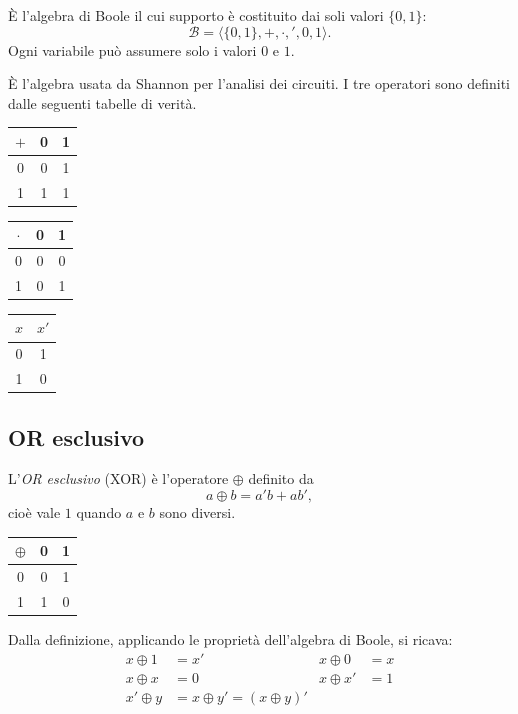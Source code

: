 \documentclass[11pt,a4paper]{article}
\begin{document}
\begin{definizione}
È l'algebra di Boole il cui supporto è costituito dai soli valori $\{0, 1\}$:
\[
  \mathcal{B} = \langle \{0,1\}, +, \cdot, ', 0, 1 \rangle .
\]
Ogni variabile può assumere solo i valori $0$ e $1$.
\end{definizione}

È l'algebra usata da Shannon per l'analisi dei circuiti. I tre operatori sono
definiti dalle seguenti tabelle di verità.

\begin{center}
\begin{tabular}{c|cc}
$+$ & 0 & 1 \\ \midrule
0 & 0 & 1 \\
1 & 1 & 1
\end{tabular}
\qquad\qquad
\begin{tabular}{c|cc}
$\cdot$ & 0 & 1 \\ \midrule
0 & 0 & 0 \\
1 & 0 & 1
\end{tabular}
\qquad\qquad
\begin{tabular}{c|c}
$x$ & $x'$ \\ \midrule
0 & 1 \\
1 & 0
\end{tabular}
\end{center}

\subsection{OR esclusivo}

L'\emph{OR esclusivo} (XOR) è l'operatore $\oplus$ definito da
\[
  a \oplus b = a' b + a b' ,
\]
cioè vale $1$ quando $a$ e $b$ sono diversi.

\begin{center}
\begin{tabular}{c|cc}
$\oplus$ & 0 & 1 \\ \midrule
0 & 0 & 1 \\
1 & 1 & 0
\end{tabular}
\end{center}

Dalla definizione, applicando le proprietà dell'algebra di Boole, si ricava:
\begin{align}
x \oplus 1 &= x' & x \oplus 0 &= x \\
x \oplus x &= 0 & x \oplus x' &= 1 \\
x' \oplus y &= x \oplus y' = (x \oplus y)'
\end{align}
\end{document}
